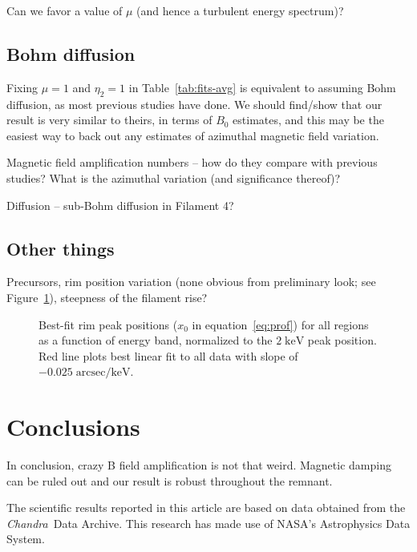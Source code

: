 \documentclass[iop, apj, numberedappendix, twocolappendix]{emulateapj}
\newcommand*{\mt}{\mathrm}
\newcommand*{\unit}[1]{\;\mt{#1}}  %
\newcommand*{\Chandra}{\textit{Chandra}\ }
\begin{document}
Can we favor a value of $\mu$ (and hence a turbulent energy spectrum)?

\subsection{Bohm diffusion}

Fixing $\mu = 1$ and $\eta_2 = 1$ in Table~\ref{tab:fits-avg} is equivalent to
assuming Bohm diffusion, as most previous studies have done.
We should find/show that our result is very similar to theirs, in terms of
$B_0$ estimates, and this may be the easiest way to back out any estimates of
azimuthal magnetic field variation.

Magnetic field amplification numbers -- how do they compare with previous
studies?  What is the azimuthal variation (and significance thereof)?

Diffusion -- sub-Bohm diffusion in Filament 4?

\subsection{Other things}

Precursors, rim position variation (none obvious from preliminary look; see
Figure~\ref{fig:peak-pos}), steepness of the filament rise?

\begin{figure}
    \centering
    \caption{Best-fit rim peak positions ($x_0$ in equation~\eqref{eq:prof})
        for all regions as a function of energy band, normalized to the $2
        \unit{keV}$ peak position.  Red line plots best linear fit to all data
        with slope of $-0.025 \unit{arcsec/keV}$.
        \label{fig:peak-pos}}
\end{figure}

\section{Conclusions}

In conclusion, crazy B field amplification is not that weird.
Magnetic damping can be ruled out and our result is robust throughout the remnant.

\acknowledgments

The scientific results reported in this article are based on data obtained from
the \Chandra Data Archive.
This research has made use of NASA's Astrophysics Data System.
\end{document}
